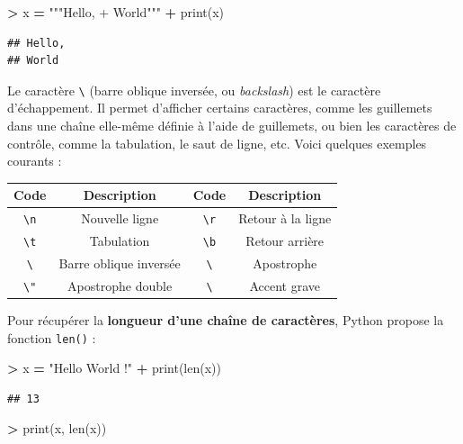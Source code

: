 \documentclass[12pt,]{book}
\newenvironment{Shaded}{\begin{snugshade}}{\end{snugshade}}
\newcommand{\StringTok}[1]{\textcolor[rgb]{0.31,0.60,0.02}{#1}}
\newcommand{\OperatorTok}[1]{\textcolor[rgb]{0.81,0.36,0.00}{\textbf{#1}}}
\newcommand{\BuiltInTok}[1]{#1}
\newcommand{\NormalTok}[1]{#1}
\numberwithin{equation}{section}
\numberwithin{countremarque}{section}
\let\BeginKnitrBlock\begin \let\EndKnitrBlock\end
\begin{document}
\begin{Shaded}
\begin{Highlighting}[]
\OperatorTok{>}\NormalTok{ x }\OperatorTok{=} \StringTok{"""Hello,}
\StringTok{+ World"""}
\OperatorTok{+} \BuiltInTok{print}\NormalTok{(x)}
\end{Highlighting}
\end{Shaded}

\begin{lstlisting}
## Hello,
## World
\end{lstlisting}

\BeginKnitrBlock{remarque}
Le caractère \texttt{\textbackslash{}} (barre oblique inversée, ou
\emph{backslash}) est le caractère d'échappement. Il permet d'afficher
certains caractères, comme les guillemets dans une chaîne elle-même
définie à l'aide de guillemets, ou bien les caractères de contrôle,
comme la tabulation, le saut de ligne, etc. Voici quelques exemples
courants :

\begin{longtable}[]{@{}cccc@{}}
\toprule
Code & Description & Code & Description\tabularnewline
\midrule
\endhead
\texttt{\textbackslash{}n} & Nouvelle ligne & \texttt{\textbackslash{}r}
& Retour à la ligne\tabularnewline
\texttt{\textbackslash{}t} & Tabulation & \texttt{\textbackslash{}b} &
Retour arrière\tabularnewline
\texttt{\textbackslash{}} & Barre oblique inversée &
\texttt{\textbackslash{}\textquotesingle{}} & Apostrophe\tabularnewline
\texttt{\textbackslash{}"} & Apostrophe double &
\texttt{\textbackslash{}\textasciigrave{}} & Accent grave\tabularnewline
\bottomrule
\end{longtable}
\EndKnitrBlock{remarque}

Pour récupérer la \textbf{longueur d'une chaîne de caractères}, Python
propose la fonction \texttt{len()} :

\begin{Shaded}
\begin{Highlighting}[]
\OperatorTok{>}\NormalTok{ x }\OperatorTok{=} \StringTok{"Hello World !"}
\OperatorTok{+} \BuiltInTok{print}\NormalTok{(}\BuiltInTok{len}\NormalTok{(x))}
\end{Highlighting}
\end{Shaded}

\begin{lstlisting}
## 13
\end{lstlisting}

\begin{Shaded}
\begin{Highlighting}[]
\OperatorTok{>} \BuiltInTok{print}\NormalTok{(x, }\BuiltInTok{len}\NormalTok{(x))}
\end{Highlighting}
\end{Shaded}
\end{document}
